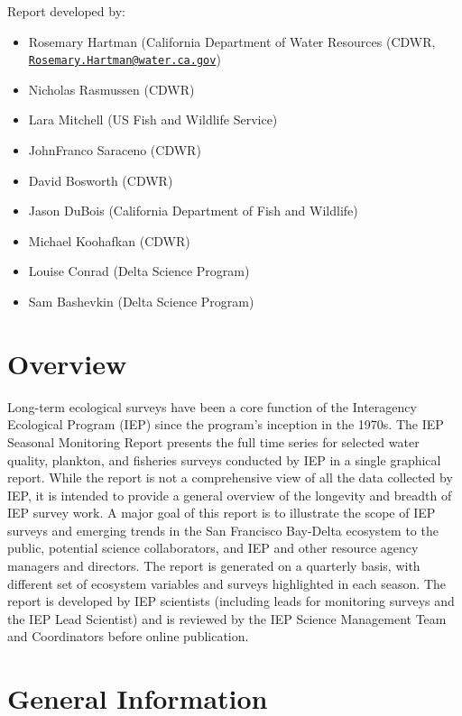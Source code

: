 \documentclass[
]{book}
\providecommand{\tightlist}{%
  \setlength{\itemsep}{0pt}\setlength{\parskip}{0pt}}
\begin{document}
Report developed by:

\begin{itemize}
\tightlist
\item
  Rosemary Hartman (California Department of Water Resources (CDWR, \href{mailto:Rosemary.Hartman@water.ca.gov}{\nolinkurl{Rosemary.Hartman@water.ca.gov}})
\item
  Nicholas Rasmussen (CDWR)
\item
  Lara Mitchell (US Fish and Wildlife Service)
\item
  JohnFranco Saraceno (CDWR)
\item
  David Bosworth (CDWR)
\item
  Jason DuBois (California Department of Fish and Wildlife)
\item
  Michael Koohafkan (CDWR)
\item
  Louise Conrad (Delta Science Program)
\item
  Sam Bashevkin (Delta Science Program)
\end{itemize}

\hypertarget{overview}{%
\section{Overview}\label{overview}}

Long-term ecological surveys have been a core function of the Interagency Ecological Program (IEP) since the program's inception in the 1970s. The IEP Seasonal Monitoring Report presents the full time series for selected water quality, plankton, and fisheries surveys conducted by IEP in a single graphical report. While the report is not a comprehensive view of all the data collected by IEP, it is intended to provide a general overview of the longevity and breadth of IEP survey work. A major goal of this report is to illustrate the scope of IEP surveys and emerging trends in the San Francisco Bay-Delta ecosystem to the public, potential science collaborators, and IEP and other resource agency managers and directors. The report is generated on a quarterly basis, with different set of ecosystem variables and surveys highlighted in each season. The report is developed by IEP scientists (including leads for monitoring surveys and the IEP Lead Scientist) and is reviewed by the IEP Science Management Team and Coordinators before online publication.

\hypertarget{general-information}{%
\section{General Information}\label{general-information}}
\end{document}
